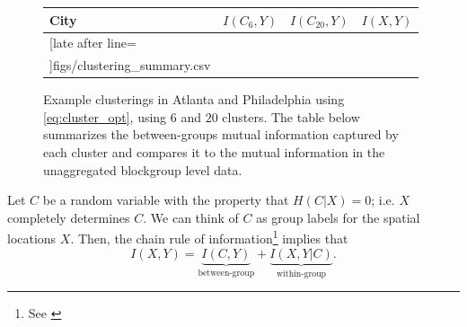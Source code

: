 \documentclass[9pt,twocolumn,twoside]{pnas-new}
\begin{document}
\begin{figure}
		\centering
		\begin{tabular}{l | c c c}
			\bfseries City  & $I(C_6, Y)$ & $I(C_{20},Y)$ & $I(X,Y)$ \\\hline
			\csvreader[late after line=\\]{figs/clustering_summary.csv}{}
			{\csvcoli & \csvcoliii & \csvcoliv & \csvcolii}
		\end{tabular}
		\caption{
			Example clusterings in Atlanta and Philadelphia using \eqref{eq:cluster_opt}, using $6$ and $20$ clusters. 
			The table below summarizes the between-groups mutual information captured by each cluster and compares it to the mutual information in the unaggregated blockgroup level data.
		} \label{fig:clusterings}

	\end{figure}
	Let $C$ be a random variable with the property that $H(C|X) = 0$; i.e. $X$ completely determines $C$. We can think of $C$ as group labels for the spatial locations $X$. Then, the chain rule of information\footnote{See \cite{Cover1991}} implies that 
	\begin{equation}
		I(X,Y) = \underbrace{I(C,Y)}_{\text{between-group}} + \underbrace{I(X,Y|C)}_{\text{within-group}}. \label{eq:chain_rule}
	\end{equation}
\end{document}
